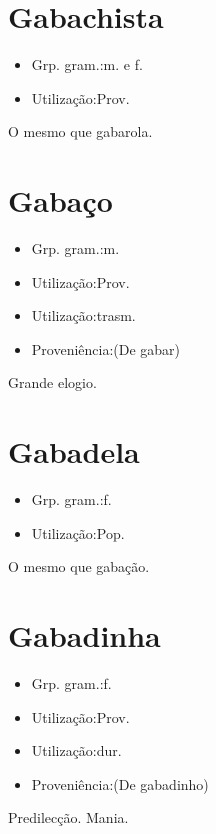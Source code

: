 \section{Gabachista}
\begin{itemize}
\item {Grp. gram.:m.  e  f.}
\end{itemize}
\begin{itemize}
\item {Utilização:Prov.}
\end{itemize}
O mesmo que \textunderscore gabarola\textunderscore .
\section{Gabaço}
\begin{itemize}
\item {Grp. gram.:m.}
\end{itemize}
\begin{itemize}
\item {Utilização:Prov.}
\end{itemize}
\begin{itemize}
\item {Utilização:trasm.}
\end{itemize}
\begin{itemize}
\item {Proveniência:(De \textunderscore gabar\textunderscore )}
\end{itemize}
Grande elogio.
\section{Gabadela}
\begin{itemize}
\item {Grp. gram.:f.}
\end{itemize}
\begin{itemize}
\item {Utilização:Pop.}
\end{itemize}
O mesmo que \textunderscore gabação\textunderscore .
\section{Gabadinha}
\begin{itemize}
\item {Grp. gram.:f.}
\end{itemize}
\begin{itemize}
\item {Utilização:Prov.}
\end{itemize}
\begin{itemize}
\item {Utilização:dur.}
\end{itemize}
\begin{itemize}
\item {Proveniência:(De \textunderscore gabadinho\textunderscore )}
\end{itemize}
Predilecção.
Mania.
